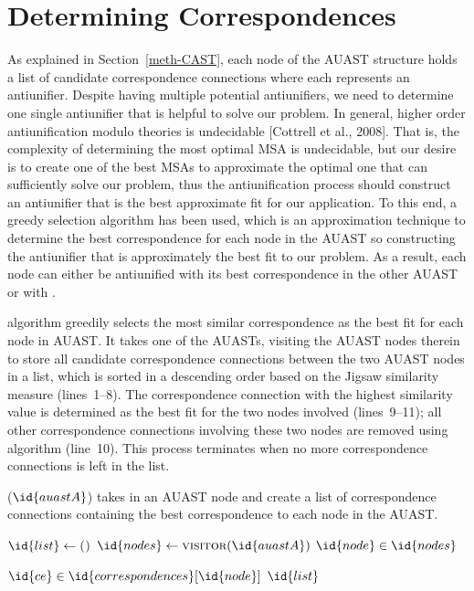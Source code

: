 \section{Determining Correspondences} \label{meth-correspondence}
As explained in Section~\ref{meth-CAST}, each node of the AUAST structure holds a list of candidate correspondence connections where each represents an antiunifier. Despite having multiple potential antiunifiers, we need to determine one single antiunifier that is helpful to solve our problem. In general, higher order antiunification modulo theories is undecidable [Cottrell et al., 2008]. That is, the complexity of determining the most optimal MSA is undecidable, but our desire is to create one of the best MSAs to approximate the optimal one that can sufficiently solve our problem, thus the antiunification process should construct an antiunifier that is the best approximate fit for our application. To this end, a greedy selection algorithm has been used, which is an approximation technique to determine the best correspondence for each node in the AUAST so constructing the antiunifier that is approximately the best fit to our problem. As a result, each node can either be antiunified with its best correspondence in the other AUAST or with \nothing.

 algorithm greedily selects the most similar correspondence as the best fit for each node in AUAST. It takes one of the AUASTs, visiting the AUAST nodes therein to store all candidate correspondence connections between the two AUAST nodes in a list, which is sorted in a descending order based on the Jigsaw similarity measure (lines~1--8). The correspondence connection with the highest similarity value is determined as the best fit for the two nodes involved (lines~9--11); all other correspondence connections involving these two nodes are removed using  algorithm (line~10). This process terminates when no more correspondence connections is left in the list.
\begin{algorithm}
\caption{($\id{auastA}$) takes in an AUAST node and create a list of correspondence connections containing the best correspondence to each node in the AUAST.}
\label{alg-determine}
\begin{algorithmic}[1]
\CreateList
    \State $\id{list} \gets \func{()}$
    \State $\id{nodes} \gets \func{visitor}(\id{auastA})$
	  \For $\id{node} \in \id{nodes}$
	
				\For $\id{ce} \in  \id{correspondences}[\id{node}]$		
			 	\EndFor  	
	   \EndFor		
	   \EndFor
 \Return $\id{list} $  	
  \end{algorithmic}
\end{algorithm}

